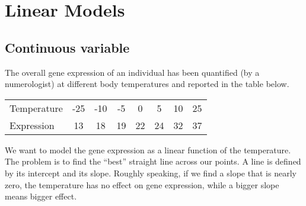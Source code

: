 \documentclass[a4paper,11pt]{article}
\begin{document}
\section{Linear Models}


\subsection{Continuous variable}

The overall gene expression of an individual has been quantified (by a numerologist) at different body temperatures 
and reported in the table below.

\begin{table}[tbh]
\centering
\begin{tabular}{ l | ccccccc }
Temperature &  -25  &  -10  &  -5  &  0   &  5  &  10  &  25  \\ 
Expression    &   13  &   18   &  19 &  22 &  24 & 32  &  37  
\end{tabular}
\end{table}

\noindent
We want to model the gene expression as a linear function of the temperature. The problem is to
find the ``best'' straight line across our points. A line is defined by its intercept and its slope. 
Roughly speaking, if we find a slope that is nearly zero, the temperature has no effect on gene expression, 
while a bigger slope means bigger effect.
\end{document}
